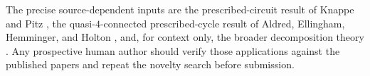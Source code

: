 \documentclass[11pt]{article}
\theoremstyle{definition}
\theoremstyle{remark}
\begin{document}
The precise source-dependent inputs are the prescribed-circuit result
of Knappe and Pitz \cite{knappe2020}, the quasi-\(4\)-connected
prescribed-cycle result of Aldred, Ellingham, Hemminger, and Holton
\cite{aldred1997}, and, for context only, the broader decomposition
theory \cite{pastor2018,nedela2024}.  Any prospective human author should verify
those applications against the published papers and repeat the novelty
search before submission.



\end{document}
